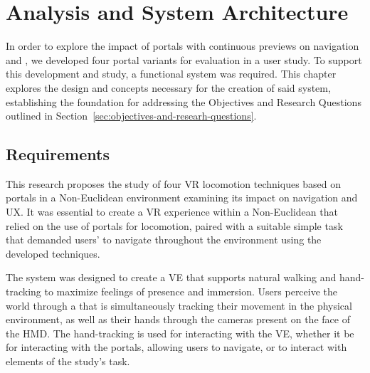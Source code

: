 
%

\makeatletter
\newcommand{\ntifpkgloaded}{%
  \@ifpackageloaded%
}
\makeatother


\chapter{Analysis and System Architecture}
\label{cha:analysis}

In order to explore the impact of portals with continuous previews on  navigation and , we developed four portal variants 
for evaluation in a user study. To support this development and study, a functional system was required. This chapter explores the design and concepts 
necessary for the creation of said system, establishing the foundation for addressing the Objectives and Research Questions outlined in 
Section~\ref{sec:objectives-and-researh-questions}.


\section{Requirements}
\label{sec:requirements}


This research proposes the study of four \gls{VR} locomotion techniques based on portals in a Non-Euclidean environment examining its impact on 
navigation and \gls{UX}. It was essential to create a \gls{VR} experience within a Non-Euclidean  that relied on the use of portals 
for locomotion, paired with a suitable simple task that demanded users' to navigate throughout the environment using the developed techniques.

The system was designed to create a \gls{VE} that supports natural walking and hand-tracking to maximize feelings of presence and immersion. Users 
perceive the world through a  that is simultaneously tracking their movement in the physical environment, as well as their hands 
through the cameras present on the face of the \gls{HMD}. The hand-tracking is used for interacting with the \gls{VE}, whether it be for interacting with the 
portals, allowing users to navigate, or to interact with elements of the study's task.

